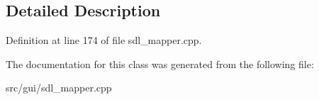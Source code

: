 \subsection{Detailed Description}


Definition at line 174 of file sdl\-\_\-mapper.\-cpp.



The documentation for this class was generated from the following file\-:\begin{DoxyCompactItemize}
\item 
src/gui/sdl\-\_\-mapper.\-cpp\end{DoxyCompactItemize}
